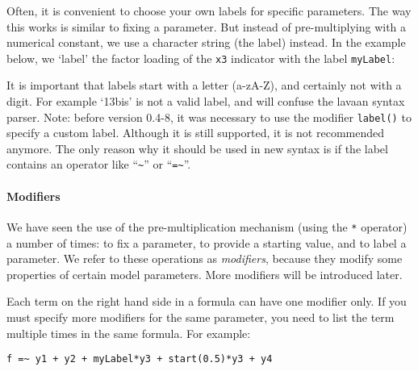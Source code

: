 Often, it is convenient to choose your own labels for specific
parameters. The way this works is similar to fixing a parameter. But
instead of pre-multiplying with a numerical constant, we use a character
string (the label) instead. In the example below, we `label' the factor
loading of the \texttt{x3} indicator with the label \texttt{myLabel}:

\begin{Shaded}
\begin{Highlighting}[]
\end{Highlighting}
\end{Shaded}

It is important that labels start with a letter (a-zA-Z), and certainly
not with a digit. For example `13bis' is not a valid label, and will
confuse the lavaan syntax parser. Note: before version 0.4-8, it was
necessary to use the modifier \texttt{label()} to specify a custom
label. Although it is still supported, it is not recommended anymore.
The only reason why it should be used in new syntax is if the label
contains an operator like ``\texttt{\textasciitilde{}}'' or
``\texttt{=\textasciitilde{}}''.

\paragraph{Modifiers}

We have seen the use of the pre-multiplication mechanism (using the
\texttt{*} operator) a number of times: to fix a parameter, to provide a
starting value, and to label a parameter. We refer to these operations
as \emph{modifiers}, because they modify some properties of certain
model parameters. More modifiers will be introduced later.

Each term on the right hand side in a formula can have one modifier
only. If you must specify more modifiers for the same parameter, you
need to list the term multiple times in the same formula. For example:

\begin{verbatim}
f =~ y1 + y2 + myLabel*y3 + start(0.5)*y3 + y4
\end{verbatim}

